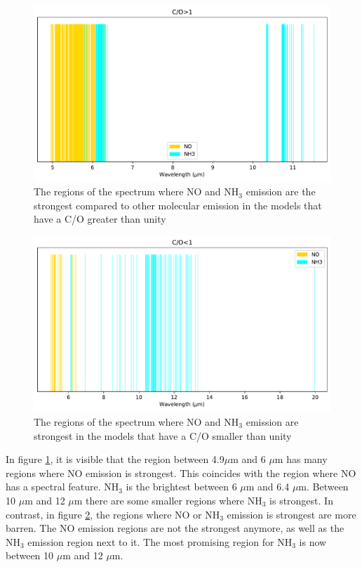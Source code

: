 \documentclass[oneside, single, authoryear, semicolon]{lion-msc}
\newcommand{\4}{$_4$}
\newcommand{\3}{$_3$}
\newcommand{\2}{$_2$}
\begin{document}
\begin{figure}[!ht]
    \centering
    \includegraphics[width=\linewidth]{Figures/ClassificationCOgt0.pdf}
    \caption{The regions of the spectrum where NO and NH\3 emission are the  strongest compared to other molecular emission in the models that have a C/O greater than unity}
    \label{fig: class>1}
\end{figure}

\begin{figure}[!ht]
    \centering
    \includegraphics[width=\linewidth]{Figures/ClassificationCOst0.pdf}
    \caption{The regions of the spectrum where NO and NH\3 emission are strongest in the models that have a C/O smaller than unity}
    \label{fig: class<1}
\end{figure}

In figure \ref{fig: class>1}, it is visible that the region between 4.9$\mu$m and 6 $\mu$m has many regions where NO emission is strongest. This coincides with the region where NO has a spectral feature. NH\3 is the brightest between 6 $\mu$m and 6.4 $\mu$m. Between 10 $\mu$m and 12 $\mu$m there are some smaller regions where NH\3 is strongest. In contrast, in figure \ref{fig: class<1}, the regions where NO or NH\3 emission is strongest are more barren. The NO emission regions are not the strongest anymore, as well as the NH\3 emission region next to it. The most promising region for NH\3 is now between 10 $\mu$m and 12 $\mu$m. 
\end{document}
